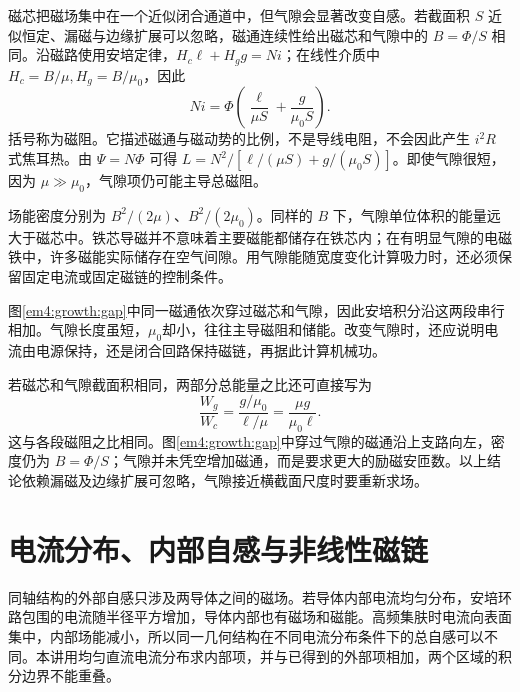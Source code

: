 磁芯把磁场集中在一个近似闭合通道中，但气隙会显著改变自感。若截面积 $S$ 近似恒定、漏磁与边缘扩展可以忽略，磁通连续性给出磁芯和气隙中的 $B=\Phi/S$ 相同。沿磁路使用安培定律，$H_c\ell+H_gg=Ni$；在线性介质中 $H_c=B/\mu,H_g=B/\mu_0$，因此
\[Ni=\Phi\left(\frac{\ell}{\mu S}+\frac g{\mu_0S}\right).\]
括号称为磁阻。它描述磁通与磁动势的比例，不是导线电阻，不会因此产生 $i^2R$ 式焦耳热。由 $\Psi=N\Phi$ 可得 $L=N^2/[\ell/(\mu S)+g/(\mu_0S)]$。即使气隙很短，因为 $\mu\gg\mu_0$，气隙项仍可能主导总磁阻。

场能密度分别为 $B^2/(2\mu)$、$B^2/(2\mu_0)$。同样的 $B$ 下，气隙单位体积的能量远大于磁芯中。铁芯导磁并不意味着主要磁能都储存在铁芯内；在有明显气隙的电磁铁中，许多磁能实际储存在空气间隙。用气隙能随宽度变化计算吸力时，还必须保留固定电流或固定磁链的控制条件。



图\ref{em4:growth:gap}中同一磁通依次穿过磁芯和气隙，因此安培积分沿这两段串行相加。气隙长度虽短，$\mu_0$却小，往往主导磁阻和储能。改变气隙时，还应说明电流由电源保持，还是闭合回路保持磁链，再据此计算机械功。



若磁芯和气隙截面积相同，两部分总能量之比还可直接写为
\[\frac{W_g}{W_c}=\frac{g/\mu_0}{\ell/\mu}=\frac{\mu g}{\mu_0\ell}.\]
这与各段磁阻之比相同。图\ref{em4:growth:gap}中穿过气隙的磁通沿上支路向左，密度仍为 $B=\Phi/S$；气隙并未凭空增加磁通，而是要求更大的励磁安匝数。以上结论依赖漏磁及边缘扩展可忽略，气隙接近横截面尺度时要重新求场。


\section{电流分布、内部自感与非线性磁链}

同轴结构的外部自感只涉及两导体之间的磁场。若导体内部电流均匀分布，安培环路包围的电流随半径平方增加，导体内部也有磁场和磁能。高频集肤时电流向表面集中，内部场能减小，所以同一几何结构在不同电流分布条件下的总自感可以不同。本讲用均匀直流电流分布求内部项，并与已得到的外部项相加，两个区域的积分边界不能重叠。


